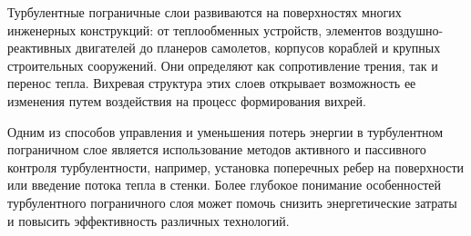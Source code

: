 	Турбулентные пограничные слои развиваются на поверхностях многих инженерных конструкций: от теплообменных устройств, элементов воздушно-реактивных двигателей до планеров самолетов, корпусов кораблей и крупных строительных сооружений. Они определяют как сопротивление трения, так и перенос тепла. Вихревая структура этих слоев открывает возможность ее изменения путем воздействия на процесс формирования вихрей. 
	
	Одним из способов управления и уменьшения потерь энергии в турбулентном пограничном слое является использование методов активного и пассивного контроля турбулентности, например, установка поперечных ребер на поверхности или введение потока тепла в стенки. Более глубокое понимание особенностей турбулентного пограничного слоя может помочь снизить энергетические затраты и повысить эффективность различных технологий.
\newpage